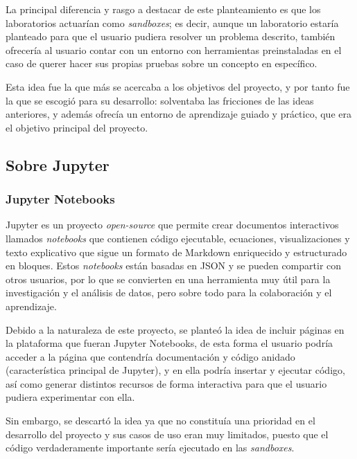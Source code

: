             La principal diferencia y rasgo a destacar de este planteamiento es que los laboratorios actuarían como \textit{sandboxes}; es decir, aunque un laboratorio estaría planteado para que el usuario pudiera resolver un problema descrito, también ofrecería al usuario contar con un entorno con herramientas preinstaladas en el caso de querer hacer sus propias pruebas sobre un concepto en específico.

            Esta idea fue la que más se acercaba a los objetivos del proyecto, y por tanto fue la que se escogió para su desarrollo: solventaba las fricciones de las ideas anteriores, y además ofrecía un entorno de aprendizaje guiado y práctico, que era el objetivo principal del proyecto.

            \newpage

        \subsection{Sobre Jupyter}

            \subsubsection{Jupyter Notebooks}
                
                Jupyter \cite{jupyter} es un proyecto \textit{open-source} que permite crear documentos interactivos llamados \textit{notebooks} que contienen código ejecutable, ecuaciones, visualizaciones y texto explicativo que sigue un formato de Markdown enriquecido y estructurado en bloques. Estos \textit{notebooks} están basadas en JSON y se pueden compartir con otros usuarios, por lo que se convierten en una herramienta muy útil para la investigación y el análisis de datos, pero sobre todo para la colaboración y el aprendizaje.
            
                Debido a la naturaleza de este proyecto, se planteó la idea de incluir páginas en la plataforma que fueran Jupyter Notebooks, de esta forma el usuario podría acceder a la página que contendría documentación y código anidado (característica principal de Jupyter), y en ella podría insertar y ejecutar código, así como generar distintos recursos de forma interactiva para que el usuario pudiera experimentar con ella.

                Sin embargo, se descartó la idea ya que no constituía una prioridad en el desarrollo del proyecto y sus casos de uso eran muy limitados, puesto que el código verdaderamente importante sería ejecutado en las \textit{sandboxes}.
                

